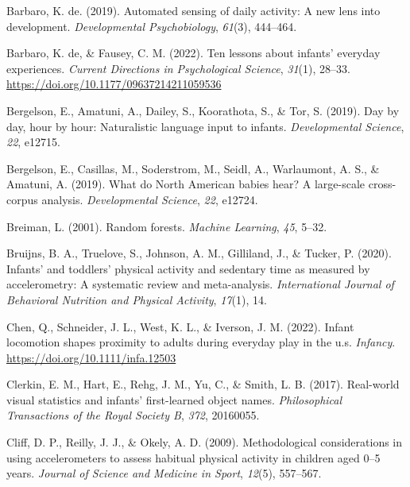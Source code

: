 \documentclass[
  man]{apa6}
\newlength{\cslhangindent}
\newlength{\cslentryspacingunit} %
\newenvironment{CSLReferences}[2] %
 {%
  \setlength{\parindent}{0pt}
  \ifodd #1
  \let\oldpar\par
  \def\par{\hangindent=\cslhangindent\oldpar}
  \fi
  \setlength{\parskip}{#2\cslentryspacingunit}
 }%
 {}
\begin{document}
\begin{CSLReferences}{1}{0}
\leavevmode{}%
Barbaro, K. de. (2019). Automated sensing of daily activity: A new lens into development. \emph{Developmental Psychobiology}, \emph{61}(3), 444--464.

\leavevmode{}%
Barbaro, K. de, \& Fausey, C. M. (2022). Ten lessons about infants' everyday experiences. \emph{Current Directions in Psychological Science}, \emph{31}(1), 28--33. \url{https://doi.org/10.1177/09637214211059536}

\leavevmode{}%
Bergelson, E., Amatuni, A., Dailey, S., Koorathota, S., \& Tor, S. (2019). Day by day, hour by hour: Naturalistic language input to infants. \emph{Developmental Science}, \emph{22}, e12715.

\leavevmode{}%
Bergelson, E., Casillas, M., Soderstrom, M., Seidl, A., Warlaumont, A. S., \& Amatuni, A. (2019). What do {N}orth {A}merican babies hear? {A} large-scale cross-corpus analysis. \emph{Developmental Science}, \emph{22}, e12724.

\leavevmode{}%
Breiman, L. (2001). Random forests. \emph{Machine Learning}, \emph{45}, 5--32.

\leavevmode{}%
Bruijns, B. A., Truelove, S., Johnson, A. M., Gilliland, J., \& Tucker, P. (2020). Infants' and toddlers' physical activity and sedentary time as measured by accelerometry: A systematic review and meta-analysis. \emph{International Journal of Behavioral Nutrition and Physical Activity}, \emph{17}(1), 14.

\leavevmode{}%
Chen, Q., Schneider, J. L., West, K. L., \& Iverson, J. M. (2022). Infant locomotion shapes proximity to adults during everyday play in the u.s. \emph{Infancy}. \url{https://doi.org/10.1111/infa.12503}

\leavevmode{}%
Clerkin, E. M., Hart, E., Rehg, J. M., Yu, C., \& Smith, L. B. (2017). Real-world visual statistics and infants' first-learned object names. \emph{Philosophical Transactions of the Royal Society B}, \emph{372}, 20160055.

\leavevmode{}%
Cliff, D. P., Reilly, J. J., \& Okely, A. D. (2009). Methodological considerations in using accelerometers to assess habitual physical activity in children aged 0--5 years. \emph{Journal of Science and Medicine in Sport}, \emph{12}(5), 557--567.


\end{CSLReferences}
\end{document}
